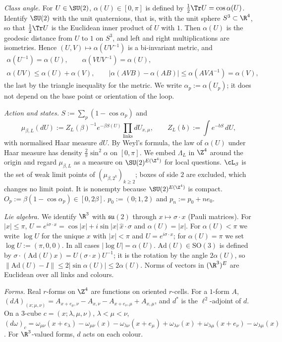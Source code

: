 \emph{Class angle.} For $U\in\SU(2)$, $\alpha(U)\in[0,\pi]$ is defined by $\tfrac12\Tr U=\cos\alpha(U)$.
Identify $\SU(2)$ with the unit quaternions, that is, with the unit sphere $S^3\subset\R^4$, so that $\tfrac12\Tr U$ is the Euclidean inner product of $U$ with $1$. Then $\alpha(U)$ is the geodesic distance from $U$ to $1$ on $S^3$, and left and right multiplications are isometries. Hence $(U,V)\mapsto\alpha(UV^{-1})$ is a bi-invariant metric, and
\begin{equation}\label{pf:eq-alpha}
\begin{gathered}
\alpha(U^{-1})=\alpha(U),\qquad \alpha(VUV^{-1})=\alpha(U),\\
\alpha(UV)\le\alpha(U)+\alpha(V),\qquad |\alpha(AVB)-\alpha(AB)|\le\alpha(AVA^{-1})=\alpha(V),
\end{gathered}
\end{equation}
the last by the triangle inequality for the metric.
We write $\alpha_p:=\alpha(U_p)$; it does not depend on the base point or orientation of the loop.

\emph{Action and states.} $S:=\sum_p(1-\cos\alpha_p)$ and
\[
\mu_{\beta,L}(dU):=Z_L(\beta)^{-1}e^{-\beta S(U)}\prod_{\text{links}}dU_{x,\mu},\qquad Z_L(b):=\int e^{-bS}\,dU,
\]
with normalised Haar measure $dU$. By Weyl's formula, the law of $\alpha(U)$ under Haar measure has density $\tfrac2\pi\sin^2\alpha$ on $[0,\pi]$.
We embed $\Lambda_L$ in $\Z^4$ around the origin and regard $\mu_{\beta,L}$ as a measure on $\SU(2)^{E(\Z^4)}$ for local questions.
$\cL_\beta$ is the set of weak limit points of $(\mu_{\beta,2^k})_{k\ge2}$; boxes of side $2$ are excluded, which changes no limit point. It is nonempty because $\SU(2)^{E(\Z^4)}$ is compact.
$O_p:=\beta(1-\cos\alpha_p)\in[0,2\beta]$. $p_0:=(0;1,2)$ and $p_n:=p_0+ne_0$.

\emph{Lie algebra.} We identify $\R^3$ with $\mathfrak{su}(2)$ through $x\mapsto\sigma\cdot x$ (Pauli matrices). For $|x|\le\pi$, $U=e^{i\sigma\cdot x}=\cos|x|+i\sin|x|\,\hat x\cdot\sigma$ and $\alpha(U)=|x|$. For $\alpha(U)<\pi$ we write $\log U$ for the unique $x$ with $|x|<\pi$ and $U=e^{i\sigma\cdot x}$; for $\alpha(U)=\pi$ we set $\log U:=(\pi,0,0)$. In all cases $|\log U|=\alpha(U)$. $\mathrm{Ad}(U)\in\mathrm{SO}(3)$ is defined by $\sigma\cdot(\mathrm{Ad}(U)x)=U(\sigma\cdot x)U^{-1}$; it is the rotation by the angle $2\alpha(U)$, so $\|\mathrm{Ad}(U)-I\|\le2|\sin\alpha(U)|\le2\alpha(U)$.
Norms of vectors in $(\R^3)^E$ are Euclidean over all links and colours.

\emph{Forms.} Real $r$-forms on $\Z^4$ are functions on oriented $r$-cells. For a $1$-form $A$, $(dA)_{(x;\mu,\nu)}=A_{x+e_\mu,\nu}-A_{x,\nu}-A_{x+e_\nu,\mu}+A_{x,\mu}$, and $d^*$ is the $\ell^2$-adjoint of $d$. On a $3$-cube $c=(x;\lambda,\mu,\nu)$, $\lambda<\mu<\nu$,
$(d\omega)_c=\omega_{\mu\nu}(x+e_\lambda)-\omega_{\mu\nu}(x)-\omega_{\lambda\nu}(x+e_\mu)+\omega_{\lambda\nu}(x)+\omega_{\lambda\mu}(x+e_\nu)-\omega_{\lambda\mu}(x)$.
For $\R^3$-valued forms, $d$ acts on each colour.

